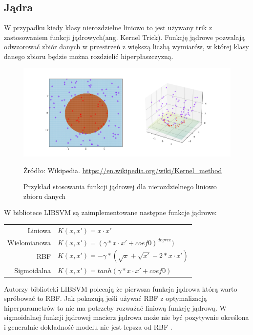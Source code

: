 \documentclass[paper=a4, fontsize=11pt]{scrartcl} %
\numberwithin{equation}{section} %
\numberwithin{figure}{section} %
\newcommand*{\captionsource}[2]{%
  \caption[{#1}]{%
      #1}
    Źródło: #2%
}
\begin{document}
\subsection{Jądra}
    \par W przypadku kiedy klasy nierozdzielne liniowo to jest używany trik z zastosowaniem
    funkcji jądrowych(ang. Kernel Trick). Funkcję jądrowe pozwalają odwzorować zbiór danych
    w przestrzeń z większą liczbą wymiarów, w której klasy danego zbioru będzie można rozdzielić
    hiperpłaszczyzną. 

    \begin{figure}[H]
        \begin{center}
            \includegraphics[scale=0.2]{./img/kernel_trick.png}
        \captionsource{Przykład stosowania funkcji jądrowej dla nierozdzielnego liniowo zbioru
        danych}{Wikipedia. \url{https://en.wikipedia.org/wiki/Kernel_method}}
        \label{fig:kernel_trick}
        \end{center}
    \end{figure}

    \newpage 

    \par W bibliotece LIBSVM są zaimplementowane następne funkcje jądrowe:

    \begin{center}
        \begin{tabular}{rl}
            Liniowa & $K(x,x') = x\cdot x'$\\
            Wielomianowa & $K(x,x') = (\gamma*x \cdot x'+coef0)^{degree})$\\
            RBF & $K(x,x') =  -\gamma * (\sqrt{x}+\sqrt{x'}-2 * x\cdot x')$ \\
            Sigmoidalna & $K(x,x') = tanh(\gamma*x \cdot x'+coef0)$
        \end{tabular}
    \end{center}

    \par Autorzy biblioteki LIBSVM polecają \cite{hsu2003practical} że pierwsza funkcja jądrowa
    którą warto spróbować to RBF.  Jak pokazują \cite{keerthi2003asymptotic} jeśli używać RBF z
    optymalizacją hiperparametrów to nie ma potrzeby rozważać liniową funkcję jądrową. W sigmoidalnej
    funkcji jądrowej macierz jądrowa może nie być pozytywnie określona i generalnie dokładność modelu
    nie jest lepsza od RBF \cite{lin2003study}. 
\end{document}
